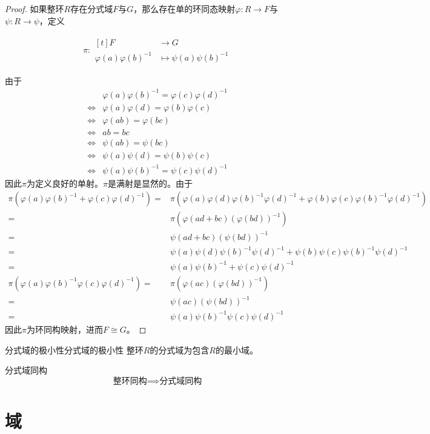 \documentclass[lang = cn, scheme = chinese, thmcnt = section]{elegantbook}
\newcommand{\function}[5]{
	\begin{align*}
		#1:\begin{aligned}[t]
			#2 &\longrightarrow #3\\
			#4 &\longmapsto #5
		\end{aligned}
	\end{align*}
}                                     %
\begin{document}
\begin{proof}
	如果整环$R$存在分式域$F$与$G$，那么存在单的环同态映射$\varphi:R\to F$与$\psi:R\to\psi$，定义
	\function{\pi}{F}{G}{\varphi(a)\varphi(b)^{-1}}{\psi(a)\psi(b)^{-1}}
	由于
	\begin{align*}
		& \varphi(a)\varphi(b)^{-1}=\varphi(c)\varphi(d)^{-1}\\
		\iff & \varphi(a)\varphi(d)=\varphi(b)\varphi(c)\\
		\iff & \varphi(ab)=\varphi(bc)\\
		\iff & ab=bc\\
		\iff & \psi(ab)=\psi(bc)\\
		\iff & \psi(a)\psi(d)=\psi(b)\psi(c)\\
		\iff & \psi(a)\psi(b)^{-1}=\psi(c)\psi(d)^{-1}
	\end{align*}
	因此$\pi$为定义良好的单射。$\pi$是满射是显然的。由于
	\begin{align*}
		\pi(\varphi(a)\varphi(b)^{-1}+\varphi(c)\varphi(d)^{-1})
		= &\pi(\varphi(a)\varphi(d)\varphi(b)^{-1}\varphi(d)^{-1}+\varphi(b)\varphi(c)\varphi(b)^{-1}\varphi(d)^{-1})\\
		= & \pi(\varphi(ad+bc)(\varphi(bd))^{-1})\\
		= & \psi(ad+bc)(\psi(bd))^{-1}\\
		= & \psi(a)\psi(d)\psi(b)^{-1}\psi(d)^{-1}+\psi(b)\psi(c)\psi(b)^{-1}\psi(d)^{-1}\\
		= & \psi(a)\psi(b)^{-1}+\psi(c)\psi(d)^{-1}\\
		\pi(\varphi(a)\varphi(b)^{-1}\varphi(c)\varphi(d)^{-1})
		= & \pi(\varphi(ac)(\varphi(bd))^{-1})\\
		= & \psi(ac)(\psi(bd))^{-1}\\
		= & \psi(a)\psi(b)^{-1}\psi(c)\psi(d)^{-1}
	\end{align*}
	因此$\pi$为环同构映射，进而$F\cong G$。
\end{proof}

\begin{theorem}{分式域的极小性}{分式域的极小性}
	整环$R$的分式域为包含$R$的最小域。
\end{theorem}

\begin{theorem}{}{分式域同构}
	$$
	\text{整环同构}\implies\text{分式域同构}
	$$
\end{theorem}

\chapter{域}
\end{document}
